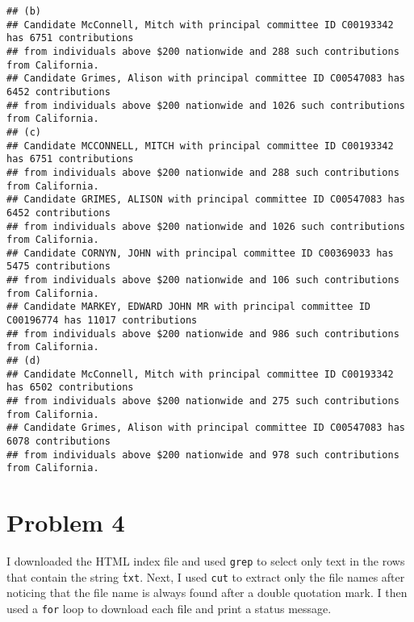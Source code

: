 \documentclass{article}\usepackage[]{graphicx}\usepackage[]{color}
\makeatletter
\newenvironment{kframe}{%
 \def\at@end@of@kframe{}%
 \ifinner\ifhmode%
  \def\at@end@of@kframe{\end{minipage}}%
  \begin{minipage}{\columnwidth}%
 \fi\fi%
 \def\FrameCommand##1{\hskip\@totalleftmargin \hskip-\fboxsep
 \colorbox{shadecolor}{##1}\hskip-\fboxsep
     \hskip-\linewidth \hskip-\@totalleftmargin \hskip\columnwidth}%
 \MakeFramed {\advance\hsize-\width
   \@totalleftmargin\z@ \linewidth\hsize
   \@setminipage}}%
 {\par\unskip\endMakeFramed%
 \at@end@of@kframe}
\newenvironment{knitrout}{}{} %
\makeatother
\begin{document}
\begin{knitrout}
\begin{kframe}
\begin{verbatim}
## (b)
## Candidate McConnell, Mitch with principal committee ID C00193342 has 6751 contributions 
## from individuals above $200 nationwide and 288 such contributions from California.
## Candidate Grimes, Alison with principal committee ID C00547083 has 6452 contributions 
## from individuals above $200 nationwide and 1026 such contributions from California.
## (c)
## Candidate MCCONNELL, MITCH with principal committee ID C00193342 has 6751 contributions 
## from individuals above $200 nationwide and 288 such contributions from California.
## Candidate GRIMES, ALISON with principal committee ID C00547083 has 6452 contributions 
## from individuals above $200 nationwide and 1026 such contributions from California.
## Candidate CORNYN, JOHN with principal committee ID C00369033 has 5475 contributions 
## from individuals above $200 nationwide and 106 such contributions from California.
## Candidate MARKEY, EDWARD JOHN MR with principal committee ID C00196774 has 11017 contributions 
## from individuals above $200 nationwide and 986 such contributions from California.
## (d)
## Candidate McConnell, Mitch with principal committee ID C00193342 has 6502 contributions 
## from individuals above $200 nationwide and 275 such contributions from California.
## Candidate Grimes, Alison with principal committee ID C00547083 has 6078 contributions 
## from individuals above $200 nationwide and 978 such contributions from California.
\end{verbatim}
\end{kframe}
\end{knitrout}
\section{Problem 4}

I downloaded the HTML index file and used \texttt{grep} to select only text in the rows that contain the string \texttt{\.txt}. Next, I used \texttt{cut} to extract only the file names after noticing that the file name is always found after a double quotation mark. I then used a \texttt{for} loop to download each file and print a status message.
\end{document}
